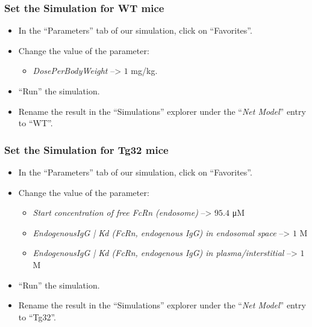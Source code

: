 \documentclass[fleqn,10pt]{physiome}
\begin{document}
\subsubsection{Set the Simulation for WT mice}
\begin{itemize}
    \item In the ``Parameters'' tab of our simulation, click on ``Favorites''.
    \item Change the value of the parameter: 
    \begin{itemize}
        \item \textit{DosePerBodyWeight} --> $1$ mg/kg.
    \end{itemize}
    \item ``Run'' the simulation.
    \item Rename the result in the ``Simulations'' explorer under the ``\textit{Net Model}'' entry to ``WT''.
\end{itemize}

\subsubsection{Set the Simulation for Tg32 mice}
\begin{itemize}
    \item In the ``Parameters'' tab of our simulation, click on ``Favorites''.
    \item Change the value of the parameter: 
    \begin{itemize}
        \item \textit{Start concentration of free FcRn (endosome)} --> $95.4$ \si{\micro M}
        \item \textit{EndogenousIgG | Kd (FcRn, endogenous IgG) in endosomal space} --> $1$ M
        \item \textit{EndogenousIgG | Kd (FcRn, endogenous IgG) in plasma/interstitial} --> $1$ M
    \end{itemize}
    \item ``Run'' the simulation.
    \item Rename the result in the ``Simulations'' explorer under the ``\textit{Net Model}'' entry to ``Tg32''.
\end{itemize}
\end{document}
